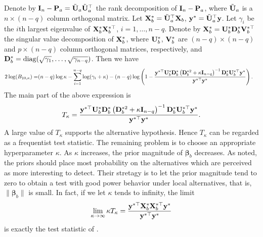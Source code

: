 \documentclass[11pt]{article}
\DeclareMathOperator{\mydiag}{diag}
\newcommand{\By}{\mathbf{y}}    \newcommand{\Bz}{\mathbf{z}}
\newcommand{\bfsym}[1]{\ensuremath{\boldsymbol{#1}}}
\def\bbeta{\bfsym \beta}
\theoremstyle{plain}
\theoremstyle{definition}
\theoremstyle{remark}
\begin{document}
Denote by $\mathbf{I}_n-\mathbf{P}_a=\tilde{\mathbf{U}}_a \tilde{\mathbf{U}}_a^\top$ the rank decomposition of $\mathbf{I}_n - \mathbf{P}_a$, where $\tilde{\mathbf{U}}_a$ is a $n\times (n-q)$ column orthogonal matrix.
Let $\mathbf{X}_b^* = \tilde{\mathbf{U}}_a^\top \mathbf{X}_b$, $\By^* =\tilde \BU_a^\top \By$.
Let $\gamma_i$ be the $i$th largest eigenvalue of $\mathbf{X}^*_b \mathbf{X}_b^{*\top}$, $i=1,\ldots, n-q$.
Denote by $\mathbf{X}_b^* =\mathbf{U}_{b}^* \mathbf{D}_{b}^* \mathbf{V}_b^{*\top}$ the singular value decomposition of $\mathbf{X}_{b}^*$, where  $\mathbf{U}_{b}^*$, $\mathbf{V}_b^*$ are $(n-q)\times (n-q)$ and $p\times (n-q)$ column orthogonal matrices, respectively, and $\BD_{b}^*=\mydiag (\sqrt {\gamma_1},\ldots, \sqrt{\gamma_{n-q}})$.
Then we have
\begin{equation*}
    \begin{split}
        2\log (B_{10,\kappa})
        =&
        (n-q)\log \kappa - \sum_{i=1}^{n-q}\log ( \gamma_i + \kappa )
         -(n-q)\log\left(1-\frac{\By^{*\top} \BU_b^*  \BD_b^{*} \left(  \BD_b^{*2} + \kappa \BI_{n-q} \right)^{-1} \BD_b^{*}   \BU_b^{*\top} \By^* }{\By^{*\top} \By^*}\right)
         .
    \end{split}
\end{equation*}
The main part of the above expression is
\begin{equation*}
    T_{\kappa} = \frac{\By^{*\top} \BU_b^*  \BD_b^{*} \left(  \BD_b^{*2} + \kappa \BI_{n-q} \right)^{-1} \BD_b^{*}   \BU_b^{*\top} \By^* }{\By^{*\top} \By^*}.
\end{equation*}
A large value of $T_{\kappa}$ supports the alternative hypothesis.
Hence $T_{\kappa}$ can be regarded as a frequentist test statistic.
The remaining problem is to choose an appropriate hyperparameter $\kappa$.
As $\kappa$ increases, the prior magnitude of $\bbeta_b$ decreases.
As \cite{Goeman2006} noted, the priors should place most probability on the alternatives which are perceived as more interesting to detect.
Their stretagy is to let the prior magnitude tend to zero to obtain a test with good power behavior under local alternatives, that is, $\|\bbeta_b\|$ is small.
In fact, if we let $\kappa$ tends to infinity, the limit
\begin{equation*}
    \lim_{\kappa\to \infty} \kappa T_{\kappa} = \frac{\By^{*\top} \BX_b^* \BX_b^{*\top} \By^* }{\By^{*\top} \By^*}
\end{equation*}
is exactly the test statistic of \cite{Goeman2006}.
\end{document}
